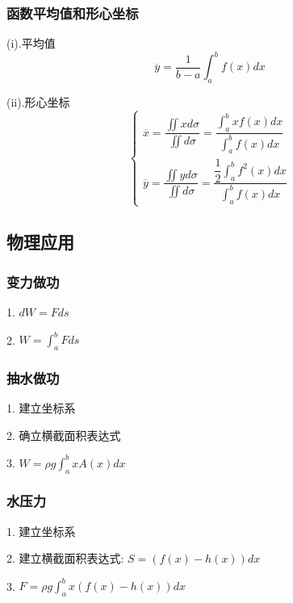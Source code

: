 \subsubsection{函数平均值和形心坐标}
\begin{theorem}[平均值和形心坐标]

	(i).平均值
	$$\overline{y}=\dfrac{1}{b-a}\int_{a}^{b}f(x)dx$$

	(ii).形心坐标
	$$\left\lbrace
		\begin{array}{l}
			\overline{x}=\dfrac{\iint xd\sigma}{\iint d\sigma}=\dfrac{\int_{a}^{b}xf(x)dx}{\int_{a}^{b}f(x)dx} \\
			\overline{y}=\dfrac{\iint yd\sigma}{\iint d\sigma}=\dfrac{\dfrac{1}{2}\int_{a}^{b}f^{2}(x)dx}{\int_{a}^{b}f(x)dx}
		\end{array}
		\right. $$
\end{theorem}
\subsection{物理应用}
\subsubsection{变力做功}
\begin{definition}[变力做功]

	1. $dW = Fds$

	2. $W=\int_{a}^{b} Fds$
\end{definition}
\subsubsection{抽水做功}
\begin{definition}[抽水做功]

	1. 建立坐标系

	2. 确立横截面积表达式

	3. $W=\rho g\int_{a}^{b}xA(x)dx$
\end{definition}
\subsubsection{水压力}
\begin{definition}[水中受到的压力]

	1. 建立坐标系

	2. 建立横截面积表达式:  $S=(f(x)-h(x))dx$

	3. $F=\rho g\int_{a}^{b}x(f(x)-h(x))dx$
\end{definition}

